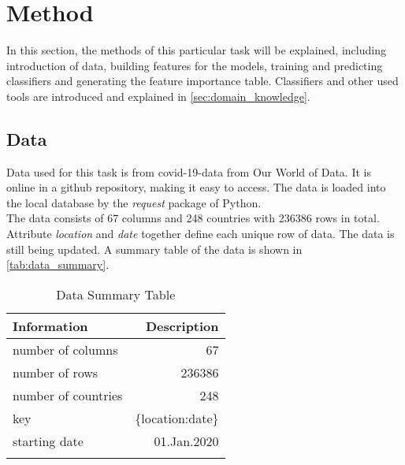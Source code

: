 \documentclass[10pt, a4paper, twocolumn]{article} %
\begin{document}
\section{Method}
In this section, the methods of this particular task will be explained, including introduction of data, building 
features for the models, training and predicting classifiers and generating the feature importance table. 
Classifiers and other used tools are introduced and explained in \autoref{sec:domain_knowledge}.
\subsection{Data}
Data used for this task is from covid-19-data from Our World of Data. It is online in a github repository, making 
it easy to access. The data is loaded into the local database by the \emph{request} package of Python.\\[10pt]
The data consists of 67 columns and 248 countries with 236386 rows in total. Attribute \emph{location} and 
\emph{date} together define each unique row of data. The data is still being updated. 
A summary table of the data is shown 
in \autoref{tab:data_summary}.
\begin{table}
	\caption{Data Summary Table}
	\centering
	\begin{tabular}{lr}
		\toprule
		\textbf{Information} & \textbf{Description} \\
		\midrule
		number of columns & 67 \\
		number of rows & 236386 \\
		number of countries & 248 \\
		key & \{location:date\}\\
		starting date & 01.Jan.2020\\
		\bottomrule
	\label{tab:data_summary}
	\end{tabular}
\end{table}
\end{document}
